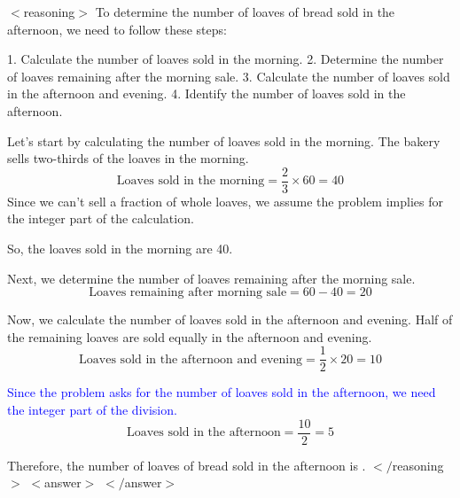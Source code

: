 
\begin{tcolorbox}[float, breakable, title=\textbf{Model:} \emph{d1}-LLaDA \\ \textbf{Generation Sequence Length:} 512\\ \textbf{Question:} A bakery produces 60 loaves of bread each day. Two-thirds of the loaves are sold in the morning and half of what is left is sold equally in the afternoon and evening. How many loaves of bread are sold in the afternoon?]
$<$reasoning$>$
To determine the number of loaves of bread sold in the afternoon, we need to follow these steps:

1. Calculate the number of loaves sold in the morning.
2. Determine the number of loaves remaining after the morning sale.
3. Calculate the number of loaves sold in the afternoon and evening.
4. Identify the number of loaves sold in the afternoon.

Let's start by calculating the number of loaves sold in the morning. The bakery sells two-thirds of the loaves in the morning.
\[
\text{Loaves sold in the morning} = \frac{2}{3} \times 60 = 40
\]
Since we can't sell a fraction of whole loaves, we assume the problem implies for the integer part of the calculation.

So, the loaves sold in the morning are 40.

Next, we determine the number of loaves remaining after the morning sale.
\[
\text{Loaves remaining after morning sale} = 60 - 40 = 20
\]

Now, we calculate the number of loaves sold in the afternoon and evening. Half of the remaining loaves are sold equally in the afternoon and evening.
\[
\text{Loaves sold in the afternoon and evening} = \frac{1}{2} \times 20 = 10
\]

\textcolor{blue}{Since the problem asks for the number of loaves sold in the afternoon, we need the integer part of the division.}
\[
\text{Loaves sold in the afternoon} = \frac{10}{2} = 5
\]

Therefore, the number of loaves of bread sold in the afternoon is .
$</$reasoning$>$
$<$answer$>$
\textcolor{green!70!black}{}
$</$answer$>$
\end{tcolorbox}
